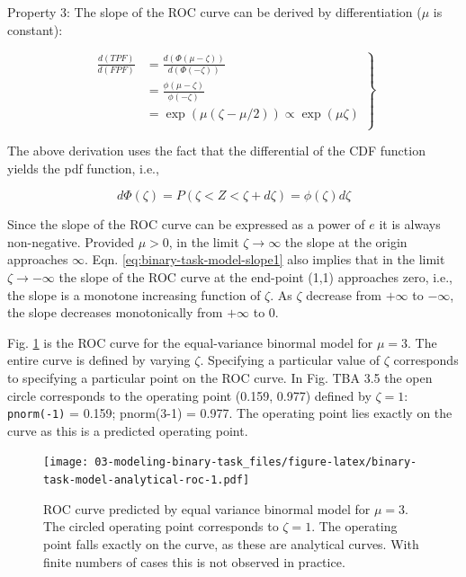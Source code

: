 \documentclass[
]{book}
\begin{document}
Property 3: The slope of the ROC curve can be derived by differentiation (\(\mu\) is constant):

\begin{equation} 
\left.
\begin{aligned}
\frac{d(TPF)}{d(FPF)}&=\frac{d(\Phi(\mu-\zeta))}{d(\Phi(-\zeta))}\\
&=\frac{\phi(\mu-\zeta)}{\phi(-\zeta)}\\
&=\exp(\mu(\zeta-\mu/2)) \propto \exp(\mu \zeta)\\
\end{aligned}
\right \}
\label{eq:binary-task-model-slope1}
\end{equation}

The above derivation uses the fact that the differential of the CDF function yields the pdf function, i.e.,

\[d\Phi(\zeta)=P\left ( \zeta < Z < \zeta + d \zeta \right ) = \phi(\zeta)d\zeta\]

Since the slope of the ROC curve can be expressed as a power of \(e\) it is always non-negative. Provided \(\mu > 0\), in the limit \(\zeta\rightarrow \infty\) the slope at the origin approaches \(\infty\). Eqn. \eqref{eq:binary-task-model-slope1} also implies that in the limit \(\zeta\rightarrow -\infty\) the slope of the ROC curve at the end-point (1,1) approaches zero, i.e., the slope is a monotone increasing function of \(\zeta\). As \(\zeta\) decrease from \(+\infty\) to \(-\infty\), the slope decreases monotonically from \(+\infty\) to 0.

Fig. \ref{fig:binary-task-model-analytical-roc} is the ROC curve for the equal-variance binormal model for \(\mu = 3\). The entire curve is defined by varying \(\zeta\). Specifying a particular value of \(\zeta\) corresponds to specifying a particular point on the ROC curve. In Fig. TBA 3.5 the open circle corresponds to the operating point (0.159, 0.977) defined by \(\zeta = 1\): \texttt{pnorm(-1)} = 0.159; pnorm(3-1) = 0.977. The operating point lies exactly on the curve as this is a predicted operating point.

\begin{figure}
\centering
\texttt{[image: 03-modeling-binary-task\_files/figure-latex/binary-task-model-analytical-roc-1.pdf]}
\caption{\label{fig:binary-task-model-analytical-roc}ROC curve predicted by equal variance binormal model for \(\mu = 3\). The circled operating point corresponds to \(\zeta = 1\). The operating point falls exactly on the curve, as these are analytical curves. With finite numbers of cases this is not observed in practice.}
\end{figure}
\end{document}

